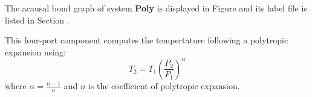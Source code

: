 

   The acausal bond graph of system \textbf{Poly} is
   displayed in Figure  and its label
   file is listed in Section .

This four-port component computes the tempertature following a
polytropic expansion using:
\begin{equation}
  T_2 = T_1 \left ( \frac{P_2}{P_1} \right )^\alpha
\end{equation}
where $\alpha = \frac{n-1}{n}$ and $n$ is the coefficient of
polytropic expansion.
